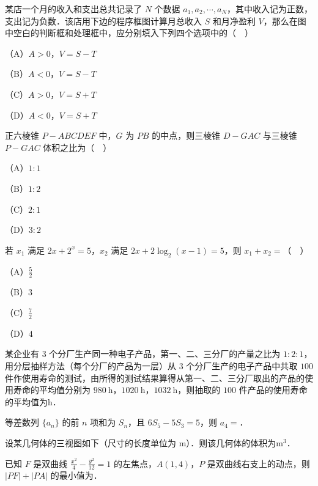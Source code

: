 \begin{question}
某店一个月的收入和支出总共记录了 $N$ 个数据 $a_1,a_2,\cdots,a_N$，其中收入记为正数，支出记为负数．该店用下边的程序框图计算月总收入 $S$ 和月净盈利 $V$，那么在图中空白的判断框和处理框中，应分别填入下列四个选项中的（　）

（A）$A>0$，$V=S-T$

（B）$A<0$，$V=S-T$

（C）$A>0$，$V=S+T$

（D）$A<0$，$V=S+T$
\nopagebreak[4]
\begin{center}\end{center}
\nopagebreak[4]
\end{question}
\begin{question}
正六棱锥 $P-ABCDEF$ 中，$G$ 为 $PB$ 的中点，则三棱锥 $D-GAC$ 与三棱锥 $P-GAC$ 体积之比为（　）

（A）$1:1$

（B）$1:2$

（C）$2:1$

（D）$3:2$

\end{question}
\begin{question}
若 $x_1$ 满足 $2x+2^x=5$，$x_2$ 满足 $2x+2\log_2(x-1)=5$，则 $x_1+x_2=$（　）

（A）$\frac52$

（B）$3$

（C）$\frac72$

（D）$4$

\end{question}

\begin{question}
某企业有 $3$ 个分厂生产同一种电子产品，第一、二、三分厂的产量之比为 $1:2:1$，用分层抽样方法（每个分厂的产品为一层）从 $3$ 个分厂生产的电子产品中共取 $100$ 件作使用寿命的测试，由所得的测试结果算得从第一、二、三分厂取出的产品的使用寿命的平均值分别为 $980\ \mathrm h$，$1020\ \mathrm h$，$1032\ \mathrm h$，则抽取的 $100$ 件产品的使用寿命的平均值为\gkblank{}$\mathrm h$．

\end{question}
\begin{question}
等差数列 $\{a_n\}$ 的前 $n$ 项和为 $S_n$，且 $6S_5-5S_3=5$，则 $a_4=$\gkblank{}．

\Needspace{0.4\textheight}
\end{question}
\begin{question}
设某几何体的三视图如下（尺寸的长度单位为 $\mathrm m$）．则该几何体的体积为\gkblank{}$\mathrm m^3$．
\nopagebreak[4]
\begin{center}\end{center}
\nopagebreak[4]
\end{question}
\begin{question}
已知 $F$ 是双曲线 $\frac{x^2}{4}-\frac{y^2}{12}=1$ 的左焦点，$A(1,4)$，$P$ 是双曲线右支上的动点，则 $|PF|+|PA|$ 的最小值为\gkblank{}．

\end{question}

